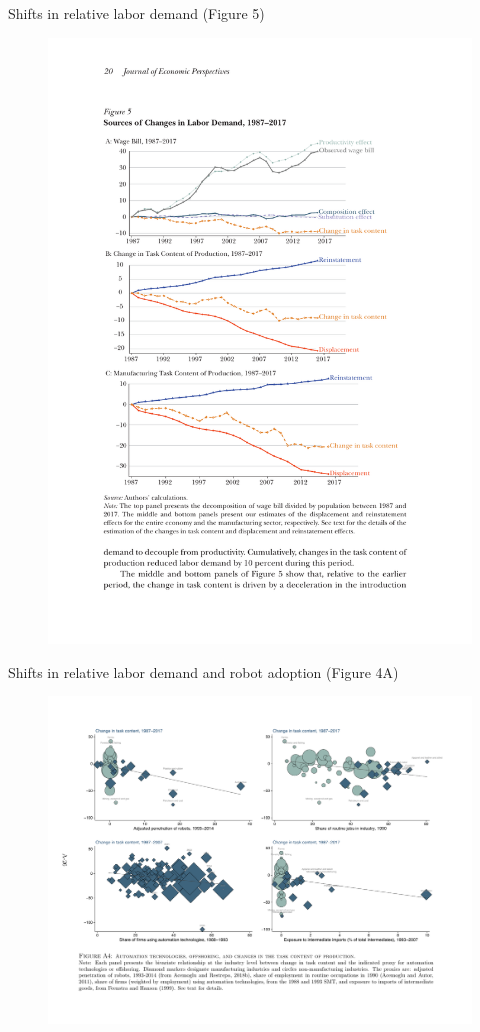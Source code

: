 \documentclass[notes=show]{beamer}
\begin{document}
\begin{frame}{Shifts in relative labor demand (Figure 5)}
\begin{figure}[p!]
 \includegraphics[width=\textwidth]{figure-AR-5B.pdf} 
\end{figure}
\end{frame}

\begin{frame}{Shifts in relative labor demand and robot adoption (Figure 4A)}
\begin{figure}[p!]
 \includegraphics[width=\textwidth]{figure-AR-A4.pdf} 
\end{figure}
\end{frame}
\end{document}
